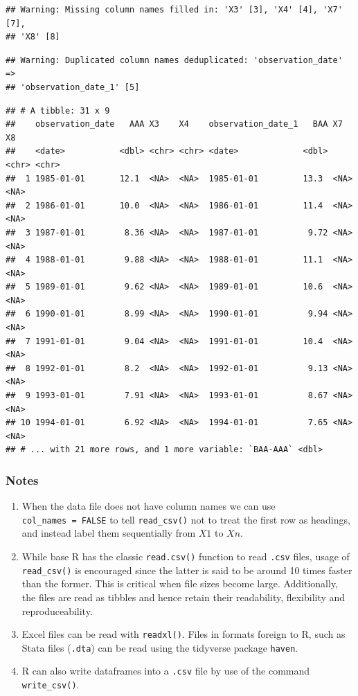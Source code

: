 \documentclass[12pt,]{article}
\begin{document}
\begin{verbatim}
## Warning: Missing column names filled in: 'X3' [3], 'X4' [4], 'X7' [7],
## 'X8' [8]
\end{verbatim}

\begin{verbatim}
## Warning: Duplicated column names deduplicated: 'observation_date' =>
## 'observation_date_1' [5]
\end{verbatim}

\begin{verbatim}
## # A tibble: 31 x 9
##    observation_date   AAA X3    X4    observation_date_1   BAA X7    X8   
##    <date>           <dbl> <chr> <chr> <date>             <dbl> <chr> <chr>
##  1 1985-01-01       12.1  <NA>  <NA>  1985-01-01         13.3  <NA>  <NA> 
##  2 1986-01-01       10.0  <NA>  <NA>  1986-01-01         11.4  <NA>  <NA> 
##  3 1987-01-01        8.36 <NA>  <NA>  1987-01-01          9.72 <NA>  <NA> 
##  4 1988-01-01        9.88 <NA>  <NA>  1988-01-01         11.1  <NA>  <NA> 
##  5 1989-01-01        9.62 <NA>  <NA>  1989-01-01         10.6  <NA>  <NA> 
##  6 1990-01-01        8.99 <NA>  <NA>  1990-01-01          9.94 <NA>  <NA> 
##  7 1991-01-01        9.04 <NA>  <NA>  1991-01-01         10.4  <NA>  <NA> 
##  8 1992-01-01        8.2  <NA>  <NA>  1992-01-01          9.13 <NA>  <NA> 
##  9 1993-01-01        7.91 <NA>  <NA>  1993-01-01          8.67 <NA>  <NA> 
## 10 1994-01-01        6.92 <NA>  <NA>  1994-01-01          7.65 <NA>  <NA> 
## # ... with 21 more rows, and 1 more variable: `BAA-AAA` <dbl>
\end{verbatim}

\subsubsection{Notes}\label{notes}

\begin{enumerate}
\def\labelenumi{\arabic{enumi}.}
\item
  When the data file does not have column names we can use
  \texttt{col\_names\ =\ FALSE} to tell \texttt{read\_csv()} not to
  treat the first row as headings, and instead label them sequentially
  from \(X1\) to \(Xn\).
\item
  While base R has the classic \texttt{read.csv()} function to read
  \texttt{.csv} files, usage of \texttt{read\_csv()} is encouraged since
  the latter is said to be around 10 times faster than the former. This
  is critical when file sizes become large. Additionally, the files are
  read as tibbles and hence retain their readability, flexibility and
  reproduceability.
\item
  Excel files can be read with \texttt{readxl()}. Files in formats
  foreign to R, such as Stata files (\texttt{.dta}) can be read using
  the tidyverse package \texttt{haven}.
\item
  R can also write dataframes into a \texttt{.csv} file by use of the
  command \texttt{write\_csv()}.
\end{enumerate}
\end{document}
